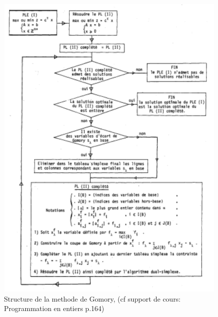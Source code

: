 \documentclass[a4paper,11pt,oneside]{report}
\theoremstyle{plain}
\newcommand{\0}{/ \! \! \! 0}
\theoremstyle{plain}
\begin{document}
 \begin{figure}
  \begin{center}
  \includegraphics[scale=1.3]{gomory}
  \caption{\label{gomory} Structure de la methode de Gomory, (cf support de cours: Programmation en entiers p.164) }
  \end{center}
\end{figure}
\end{document}
